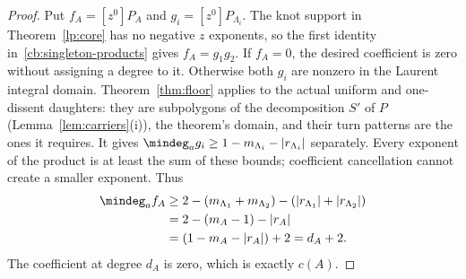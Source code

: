 \begin{proof}
Put $f_A=[z^0]P_A$ and $g_i=[z^0]P_{\Lambda_i}$. The knot support in
Theorem~\ref{lp:core} has no negative $z$ exponents, so the first
identity in~\eqref{cb:singleton-products} gives $f_A=g_1g_2$.
If $f_A=0$, the desired coefficient is zero without assigning a degree
to it. Otherwise both $g_i$ are nonzero in the Laurent integral domain.
Theorem~\ref{thm:floor} applies to the actual uniform and one-dissent
daughters: they are subpolygons of the decomposition $S'$ of $P$
(Lemma~\ref{lem:carriers}(i)), the theorem's domain, and their turn
patterns are the ones it requires. It gives
$\mindeg_a g_i\geq 1-m_{\Lambda_i}-|r_{\Lambda_i}|$ separately.
Every exponent of the product is at least the sum of these bounds;
coefficient cancellation cannot create a smaller exponent. Thus
\begin{align}
 \mindeg_a f_A
 &\geq 2-(m_{\Lambda_1}+m_{\Lambda_2})
                -(|r_{\Lambda_1}|+|r_{\Lambda_2}|)\notag\\
 &=2-(m_A-1)-|r_A|\notag\\
 &=(1-m_A-|r_A|)+2=d_A+2.
 \label{cb:singleton-gap}
\end{align}
The coefficient at degree $d_A$ is zero, which is exactly $c(A)$.
\end{proof}

